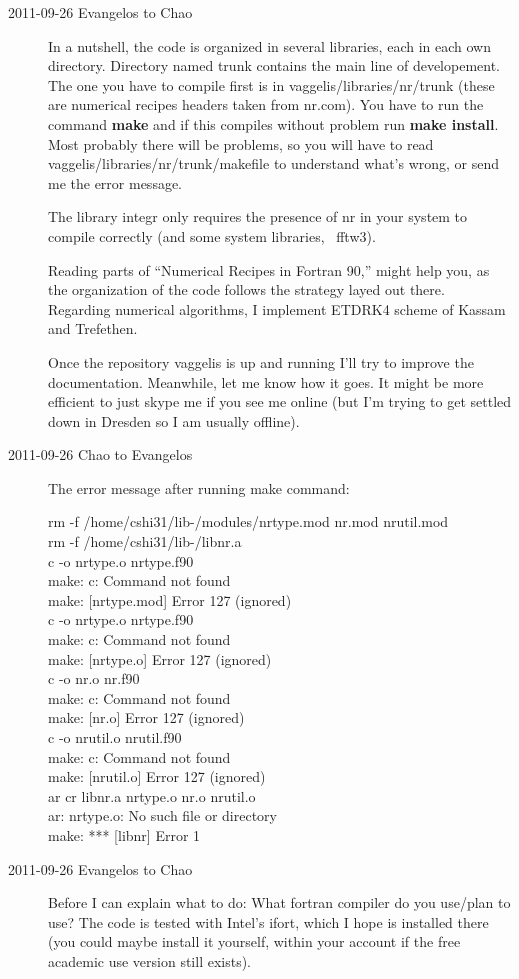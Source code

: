 \begin{description}
\item[2011-09-26 Evangelos to Chao] In a nutshell, the code is organized in
several libraries, each in each own directory. Directory named trunk contains
the main line of developement. The one you have to compile first is in 
vaggelis/libraries/nr/trunk (these are numerical recipes headers taken from
nr.com). You have to run the command \textbf{make} and if this compiles without
problem run \textbf{make install}. Most probably there will be problems, so you
will have to read vaggelis/libraries/nr/trunk/makefile to understand what's
wrong, or send me the error message.

The library integr only requires the presence of nr in your system to compile
correctly (and some system libraries, \eg\ fftw3).

Reading  parts of ``Numerical Recipes in Fortran 90,'' might help you, 
as the organization of the code follows the strategy layed out there.
Regarding numerical algorithms, I implement ETDRK4 scheme of Kassam and
Trefethen.

Once the repository vaggelis is up and running I'll try to improve the 
documentation. Meanwhile, let me know how it goes. It might be more efficient
to just skype me if you see me online (but I'm trying to get settled down in
Dresden so I am usually offline).

\item[2011-09-26 Chao to Evangelos] The error message after running make command:

rm -f /home/cshi31/lib-/modules/nrtype.mod nr.mod nrutil.mod\\
rm -f /home/cshi31/lib-/libnr.a\\
c  -o nrtype.o  nrtype.f90 \\
make: c: Command not found\\
make: [nrtype.mod] Error 127 (ignored)\\
c  -o nrtype.o  nrtype.f90 \\
make: c: Command not found\\
make: [nrtype.o] Error 127 (ignored)\\
c  -o nr.o  nr.f90 \\
make: c: Command not found\\
make: [nr.o] Error 127 (ignored)\\
c  -o nrutil.o  nrutil.f90 \\
make: c: Command not found\\
make: [nrutil.o] Error 127 (ignored)\\
ar cr libnr.a nrtype.o nr.o nrutil.o \\
ar: nrtype.o: No such file or directory\\
make: *** [libnr] Error 1\\

\item[2011-09-26 Evangelos to Chao] Before I can explain what to do: 
What fortran compiler do you use/plan to use?
The code is tested with Intel's ifort, which I hope is installed there (you
could maybe install it yourself, within your account if the free academic use 
version still exists).                                   


\end{description}
